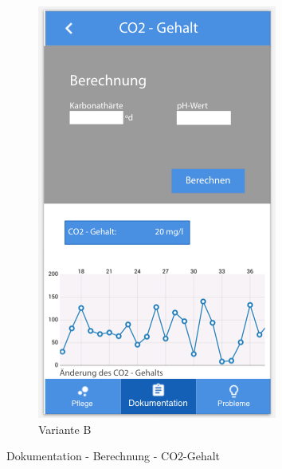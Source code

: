 \begin{figure}
\begin{subfigure}[b]{0.5\textwidth}
		\includegraphics[width=\textwidth]{co2_gehalt_2}
		\caption{Variante B}
		\label{doku:co2:b}
	\end{subfigure}	
	\caption{Dokumentation - Berechnung - CO2-Gehalt}
	\label{doku:co2}
\end{figure}

